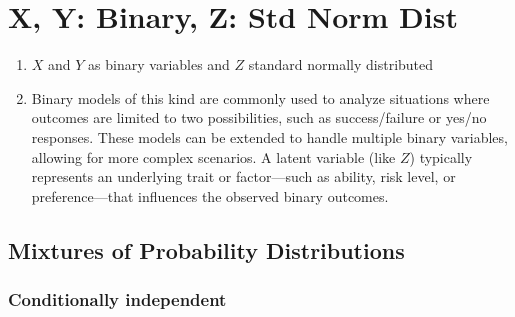 \section{X, Y: Binary, Z: Std Norm Dist}

\begin{enumerate}
    \item $X$ and $Y$ as binary variables and $Z$ standard normally distributed
    \hfill \cite{statistics/book/Statistics-for-Data-Scientists/Maurits-Kaptein}

    \item Binary models of this kind are commonly used to analyze situations where outcomes are limited to two possibilities, such as success/failure or yes/no responses.
    These models can be extended to handle multiple binary variables, allowing for more complex scenarios.
    A latent variable (like $Z$) typically represents an underlying trait or factor—such as ability, risk level, or preference—that influences the observed binary outcomes.
    \hfill \cite{statistics/book/Statistics-for-Data-Scientists/Maurits-Kaptein, common/online/chatgpt}
\end{enumerate}




\subsection{Mixtures of Probability Distributions}

\subsubsection{Conditionally independent}

